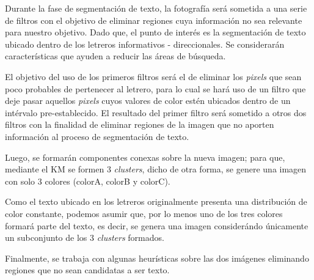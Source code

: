 Durante la fase de segmentación de texto, la fotografía será sometida a una
serie de filtros con el objetivo de eliminar regiones cuya información no sea
relevante para nuestro objetivo. Dado que, el punto de interés es la
segmentación de texto ubicado dentro de los letreros informativos -
direccionales. Se considerarán características que ayuden a reducir las áreas 
de búsqueda. 

El objetivo del uso de los primeros filtros será el de eliminar los 
\textit{pixels} que sean poco probables de pertenecer al letrero, para lo cual
se hará uso de un filtro que deje pasar aquellos \textit{pixels} cuyos valores
de color estén ubicados dentro de un intérvalo pre-establecido. El resultado del
primer filtro será sometido a otros dos filtros con la finalidad de eliminar
regiones de la imagen que no aporten información al proceso de segmentación de
texto.

Luego, se formarán componentes conexas sobre la nueva imagen; para que, 
mediante el KM se formen 3 \textit{clusters}, dicho de otra forma, se genere 
una imagen con solo 3 colores (colorA, colorB y colorC).

Como el texto ubicado en los letreros originalmente presenta una distribución 
de color constante, podemos asumir que, por lo menos uno de los tres colores
formará parte del texto, es decir, se genera una imagen considerándo únicamente
un subconjunto de los 3 \textit{clusters} formados.

Finalmente, se trabaja con algunas heurísticas sobre las dos imágenes 
eliminando regiones que no sean candidatas a ser texto.
